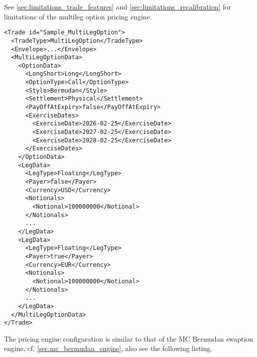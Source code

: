 \documentclass[12pt, a4paper]{article}
\begin{document}
See \ref{sec:limitations_trade_features} and \ref{sec:limitations_recalibration} for limitations of the multileg option
pricing engine.

\begin{verbatim}
<Trade id="Sample_MultiLegOption">
  <TradeType>MultiLegOption</TradeType>
  <Envelope>...</Envelope>
  <MultiLegOptionData>
    <OptionData>
      <LongShort>Long</LongShort>
      <OptionType>Call</OptionType>
      <Style>Bermudan</Style>
      <Settlement>Physical</Settlement>
      <PayOffAtExpiry>false</PayOffAtExpiry>
      <ExerciseDates>
        <ExerciseDate>2026-02-25</ExerciseDate>
        <ExerciseDate>2027-02-25</ExerciseDate>
        <ExerciseDate>2028-02-25</ExerciseDate>
      </ExerciseDates>
    </OptionData>
    <LegData>
      <LegType>Floating</LegType>
      <Payer>false</Payer>
      <Currency>USD</Currency>
      <Notionals>
        <Notional>100000000</Notional>
      </Notionals>
      ...
    </LegData>
    <LegData>
      <LegType>Floating</LegType>
      <Payer>true</Payer>
      <Currency>EUR</Currency>
      <Notionals>
        <Notional>100000000</Notional>
      </Notionals>
      ...
    </LegData>
  </MultiLegOptionData>
</Trade>
\end{verbatim}

The pricing engine configuration is similar to that of the MC Bermudan swaption engine, cf.
\ref{sec:mc_bermudan_engine}, also see the following listing.
\end{document}
